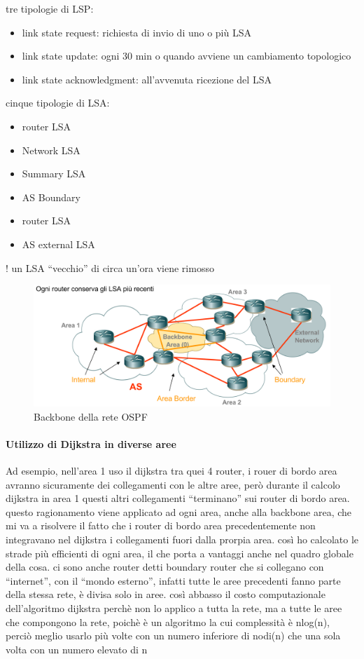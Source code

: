 tre tipologie di LSP:

\begin{itemize}
    \item link state request: richiesta di invio di uno o più LSA
    \item link state update: ogni 30 min o quando avviene un cambiamento topologico
    \item link state acknowledgment: all'avvenuta ricezione del LSA
\end{itemize}
cinque tipologie di LSA:
\begin{multicols}{2}
\begin{itemize}
    \item router LSA
    \item Network LSA
    \item Summary LSA
    \item AS Boundary
    \item router LSA
    \item AS external LSA
\end{itemize}
\end{multicols}
! un LSA “vecchio” di circa un'ora viene rimosso

\begin{figure}[h!]
    \centering
    \includegraphics[width=1\textwidth]{images/backbone.png}
    \caption{Backbone della rete OSPF}
    \label{fig:backbone}
\end{figure}

\paragraph{Utilizzo di Dijkstra in diverse aree}
Ad esempio, nell'area 1 uso il dijkstra tra quei 4 router, i rouer di bordo area avranno sicuramente dei collegamenti con le altre aree, però durante il calcolo dijkstra in area 1 questi altri collegamenti “terminano” sui router di bordo area. 
questo ragionamento viene applicato ad ogni area, anche alla backbone area, che mi va a risolvere il fatto che i router di bordo area precedentemente non integravano nel dijkstra i collegamenti fuori dalla prorpia area. così ho calcolato le strade più efficienti di ogni area, il che porta a vantaggi anche nel quadro globale della cosa.
ci sono anche router detti boundary router che si collegano con “internet”, con il “mondo esterno”, infatti tutte le aree precedenti fanno parte della stessa rete, è divisa solo in aree.
così abbasso il costo computazionale dell'algoritmo dijkstra perchè non lo applico a tutta la rete, ma a tutte le aree che compongono la rete, poichè è un algoritmo la cui complessità è nlog(n), perciò meglio usarlo più volte con un numero inferiore di nodi(n) che una sola volta con un numero  elevato di n


